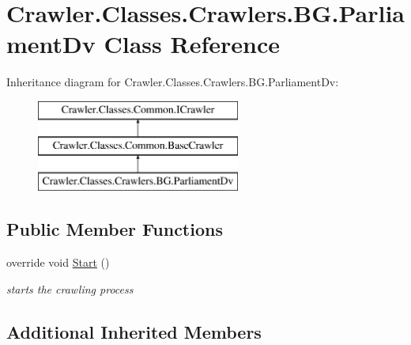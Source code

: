 \hypertarget{class_crawler_1_1_classes_1_1_crawlers_1_1_b_g_1_1_parliament_dv}{\section{Crawler.\-Classes.\-Crawlers.\-B\-G.\-Parliament\-Dv Class Reference}
\label{class_crawler_1_1_classes_1_1_crawlers_1_1_b_g_1_1_parliament_dv}
}
Inheritance diagram for Crawler.\-Classes.\-Crawlers.\-B\-G.\-Parliament\-Dv\-:\begin{figure}[H]
\begin{center}
\leavevmode
\includegraphics[height=3.000000cm]{class_crawler_1_1_classes_1_1_crawlers_1_1_b_g_1_1_parliament_dv}
\end{center}
\end{figure}
\subsection*{Public Member Functions}
\begin{DoxyCompactItemize}
\item 
override void \hyperlink{class_crawler_1_1_classes_1_1_crawlers_1_1_b_g_1_1_parliament_dv_a914bcf46a831a2d4e7e71362a5f8ed1c}{Start} ()
\begin{DoxyCompactList}\small\item\em starts the crawling process \end{DoxyCompactList}\end{DoxyCompactItemize}
\subsection*{Additional Inherited Members}


